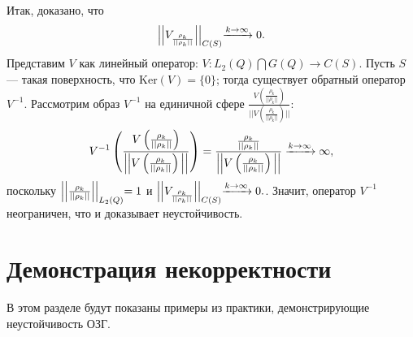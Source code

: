 \documentclass[a4paper, 12pt]{article}
\begin{document}
Итак, доказано, что $$\Bigl|\Bigl|V_{\frac{\rho_k}{||\rho_k ||}}  \Bigl|\Bigl|_{C(S)}\xrightarrow{k \rightarrow \infty} 0.$$
Представим $V$ как линейный оператор: $V: L_2(Q) \bigcap G(Q) \rightarrow C(S)$. Пусть $S$ --- такая поверхность, что $\text{Ker} (V)=\{0\}$;
тогда существует обратный оператор $V^{-1}$.
Рассмотрим образ $V^{-1}$ на единичной сфере $\frac{V\left(\frac{\rho_k}{||\rho_k ||}\right)}{||V\left(\frac{\rho_k}{||\rho_k ||}\right)||}$:
\begin{equation}
  V^{-1}\left(\frac{V\left(\frac{\rho_k}{||\rho_k ||}\right)}{\Bigl|\Bigl|V\left(\frac{\rho_k}{||\rho_k ||}\right)\Bigl|\Bigl|}\right)=\frac{\frac{\rho_k}{||\rho_k ||}}{\Bigl|\Bigl|V\left(\frac{\rho_k}{||\rho_k ||}\right)\Bigl|\Bigl|} \xrightarrow{k\rightarrow \infty} \infty,
\end{equation}
поскольку $\Bigl|\Bigl|\frac{\rho_k}{||\rho_k ||}\Bigl|\Bigl|_{L_2(Q)}=1$ и $\Bigl|\Bigl|V_{\frac{\rho_k}{||\rho_k ||}}  \Bigl|\Bigl|_{C(S)}\xrightarrow{k \rightarrow \infty} 0.$.
Значит, оператор $V^{-1}$ неограничен, что и доказывает неустойчивость.

\section{Демонстрация некорректности}
В этом разделе будут показаны примеры из практики, демонстрирующие неустойчивость ОЗГ.
\end{document}
